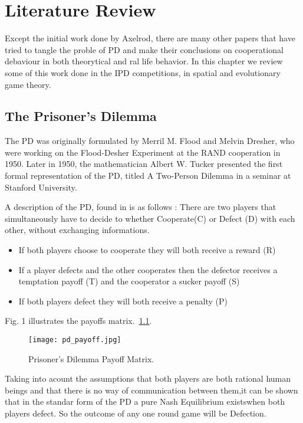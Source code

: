 \chapter{Literature Review}

Except the initial work done by Axelrod, there are many other papers that have tried
to tangle the proble of PD and make their conclusions on cooperational debaviour in
both theorytical and ral life behavior. In this chapter we review some of this work
done in the IPD competitions, in spatial and evolutionary game theory.

\section{The Prisoner's Dilemma}
The PD was originally formulated by Merril M. Flood and Melvin Dresher,
who were working on the Flood-Desher Experiment at the RAND cooperation in 1950.
Later in 1950, the mathematician Albert W. Tucker presented the first formal
representation of the PD, titled  A Two-Person Dilemma in a seminar at
Stanford University\parencite{Gass005}.

A description of the PD, found in \parencite{Li2011} is as follows :
There are two players that simultaneously have to decide to whether Cooperate(C)
or Defect (D) with each other, without exchanging informations.

\begin{itemize}
  \item If both players choose to cooperate they will both receive a reward (R)
  \item If a player defects and the other cooperates then the defector receives
  a temptation payoff (T) and the cooperator a sucker payoff (S)
  \item If both players defect they will both receive a penalty (P)
\end{itemize}

Fig. 1 illustrates the payoffs matrix.~\ref{fig:pd_payoff}.

\begin{figure}[h!]
\centering
\texttt{[image: pd\_payoff.jpg]}
\caption{Prisoner's Dilemma Payoff Matrix.\parencite{Li2011}}
\label{fig:pd_payoff}
\end{figure}

Taking into acount the assumptions that both players are both rational human beings and
that there is no way of communication between them,it can be shown that in the standar
form of the PD a pure Nash Equilibrium existswhen both players defect.
So the outcome of any one round game will be Defection.

